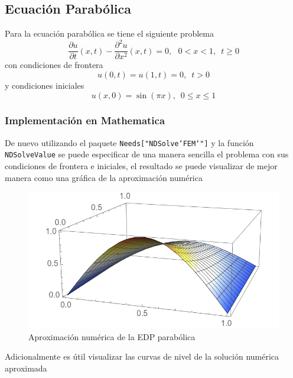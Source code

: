 \documentclass[a4paper]{article}
\begin{document}
\subsection{Ecuación Parabólica}
Para la ecuación parabólica se tiene el siguiente problema
\begin{equation}\label{eq::parabolic_pde}
\frac{\partial u}{\partial t}(x,t)-\frac{\partial^2 u}{\partial x^2}(x,t)=0,\,\,\,\,0<x<1,\,\,\,t\geq 0
\end{equation}
con condiciones de frontera
\begin{equation}
u(0,t)=u(1,t)=0,\,\,\,t>0
\end{equation}
y condiciones iniciales
\begin{equation}
u(x,0)=\sin(\pi x),\,\,\, 0 \leq x \leq 1
\end{equation}
\subsubsection{Implementación en Mathematica}
De nuevo utilizando el paquete \texttt{Needs["NDSolve`FEM`"]} y la función \texttt{NDSolveValue} se puede especificar de una manera sencilla el problema con sus condiciones de frontera e iniciales, el resultado se puede visualizar de mejor manera como una gráfica de la aproximación numérica 
\begin{figure}[H]
\begin{center}
\includegraphics[scale=0.42]{./parabolic.png} 
\end{center} 
\caption{Aproximación numérica de la EDP parabólica}
\label{fig::fig5}
\end{figure}
Adicionalmente es útil visualizar las curvas de nivel de la solución numérica aproximada
\end{document}
